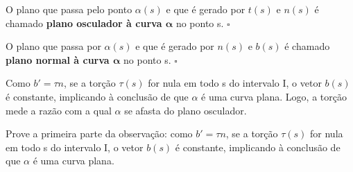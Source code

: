 \documentclass[../differential_geometry.tex]{subfiles}
\begin{document}
\begin{def*}
	O plano que passa pelo ponto \(\alpha (s)\) e que é gerado por \(t(s)\) e \(n(s)\) é chamado \textbf{plano osculador à curva \(\mathbf{\alpha} \)} no ponto s. \(\square\)
\end{def*}
\begin{def*}
	O plano que passa por \(\alpha (s)\) e que é gerado por \(n(s)\) e \(b(s)\) é chamado \textbf{plano normal à curva \(\mathbf{\alpha }\)} no ponto s. \(\square\)
\end{def*}
\begin{tcolorbox}[
		skin=enhanced,
		title=Observação,
		fonttitle=\bfseries,
		colframe=black,
		colbacktitle=cyan!75!white,
		colback=cyan!15,
		colbacklower=black,
		coltitle=black,
		drop fuzzy shadow,
	]
	Como \(b'=\tau n\), se a torção \(\tau (s)\) for nula em todo s do intervalo I, o vetor \(b(s)\) é constante, implicando à conclusão de que \(\alpha \) é uma curva plana. Logo, a torção mede a razão com a qual \(\alpha \) se afasta do plano osculador.
\end{tcolorbox}
\begin{exr}
	Prove a primeira parte da observação: como \(b'=\tau n\), se a torção \(\tau (s)\) for nula em todo s do intervalo I, o vetor \(b(s)\) é constante, implicando à conclusão de que \(\alpha \) é uma curva plana.
\end{exr}
\end{document}

